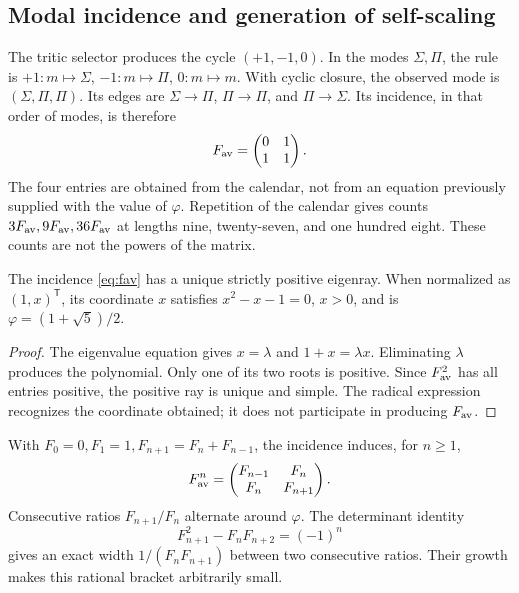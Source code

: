 \subsection{Modal incidence and generation of self-scaling}

The tritic selector produces the cycle \((+1,-1,0)\). In the modes \(\Sigma,\Pi\), the rule is \(+1:m\mapsto\Sigma\), \(-1:m\mapsto\Pi\), \(0:m\mapsto m\). With cyclic closure, the observed mode is \((\Sigma,\Pi,\Pi)\). Its edges are \(\Sigma\to\Pi\), \(\Pi\to\Pi\), and \(\Pi\to\Sigma\). Its incidence, in that order of modes, is therefore
\begin{equation}
 F_{\rm av}=\begin{pmatrix}0&1\\1&1\end{pmatrix}.
 \label{eq:fav}
\end{equation}
The four entries are obtained from the calendar, not from an equation previously supplied with the value of \(\varphi\). Repetition of the calendar gives counts \(3F_{\rm av},9F_{\rm av},36F_{\rm av}\) at lengths nine, twenty-seven, and one hundred eight. These counts are not the powers of the matrix.

\begin{theorem}
The incidence \eqref{eq:fav} has a unique strictly positive eigenray. When normalized as \((1,x)^{\mathsf T}\), its coordinate \(x\) satisfies \(x^2-x-1=0\), \(x>0\), and is \(\varphi=(1+\sqrt5)/2\).
\end{theorem}
\begin{proof}
The eigenvalue equation gives \(x=\lambda\) and \(1+x=\lambda x\). Eliminating \(\lambda\) produces the polynomial. Only one of its two roots is positive. Since \(F_{\rm av}^2\) has all entries positive, the positive ray is unique and simple. The radical expression recognizes the coordinate obtained; it does not participate in producing \(F_{\rm av}\).
\end{proof}

With \(F_0=0,F_1=1,F_{n+1}=F_n+F_{n-1}\), the incidence induces, for \(n\geq1\),
\[
 F_{\rm av}^n=\begin{pmatrix}F_{n-1}&F_n\\F_n&F_{n+1}\end{pmatrix}.
\]
Consecutive ratios \(F_{n+1}/F_n\) alternate around \(\varphi\). The determinant identity
\[
 F_{n+1}^2-F_nF_{n+2}=(-1)^n
\]
gives an exact width \(1/(F_nF_{n+1})\) between two consecutive ratios. Their growth makes this rational bracket arbitrarily small.


